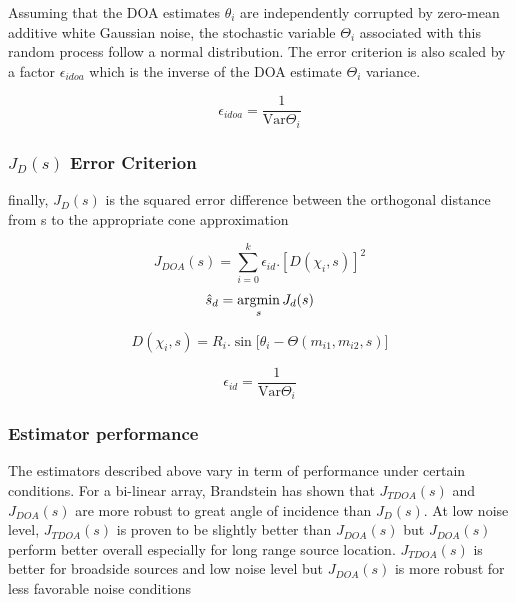 Assuming that the DOA estimates $\theta_{i}$ are independently corrupted by zero-mean additive white Gaussian noise, the stochastic variable $\Theta_{i}$ associated with this random process follow a normal distribution. The error criterion is also scaled by a factor $\epsilon_{idoa}$ which is the inverse of the DOA estimate $\Theta_{i}$ variance. 

\begin{equation}
\epsilon_{idoa}=\frac{1}{\mathrm{Var}{\Theta_{i}}}
\label{eq:epsilonjtdoa}
\end{equation}

\subsubsection{$J_{D}(s)$ Error Criterion}

finally, $J_{D}(s)$ is the squared error difference between the orthogonal distance from s to the appropriate cone approximation 

\begin{equation}
J_{DOA}(s) = {\sum}_{i=0}^k \epsilon_{id}.[D(\chi_{i},s)]^2
\label{eq:jd}
\end{equation}
\begin{equation}
\hat{s}_{d}= \argmin_{s} J_{d}(s) 
\end{equation}


\begin{equation}
D(\chi_{i},s)=R_{i}.\sin{[\theta_{i}-\Theta(m_{i1},m_{i2},s)}]  
\end{equation}

\begin{equation}
 \epsilon_{id}=\frac{1}{\mathrm{Var}{\Theta_{i}}}    
\end{equation}

\subsubsection{Estimator performance}

The estimators described above vary in term of performance under certain conditions. For a bi-linear array, Brandstein has shown that $J_{TDOA}(s)$ and $J_{DOA}(s)$ are more robust to great angle of incidence than $J_{D}(s)$. At low noise level, $J_{TDOA}(s)$ is proven to be slightly better than $J_{DOA}(s)$ but $J_{DOA}(s)$ perform better overall especially for long range source location. $J_{TDOA}(s)$ is better for broadside sources and low noise level but $J_{DOA}(s)$ is more robust for less favorable noise conditions

\fi
